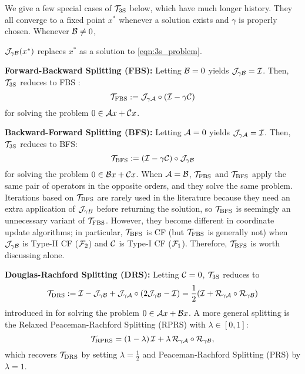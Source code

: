 We give a few special cases of ${{\mathcal{T}}_{\mathrm{3S}}}$ below, which have much longer history. They all converge to a fixed point $x^*$ whenever a solution exists and $\gamma$ is properly chosen. Whenever ${\mathcal{B}}\neq 0$, {${\mathcal{J}}_{\gamma {\mathcal{B}}}(x^*)$ replaces $x^*$  as a solution to \eqref{eqn:3s_problem}.

 \textbf{Forward-Backward Splitting (FBS):} Letting ${\mathcal{B}}=0$ yields ${\mathcal{J}}_{\gamma{\mathcal{B}}}={\mathcal{I}}$. Then, ${{\mathcal{T}}_{\mathrm{3S}}}$ reduces to FBS \cite{passty1979FBS}:
 \begin{equation}\label{eq:FBS}
 \TFBS:=\cJ_{\gamma \cA}\circ(\cI-\gamma \cC)
 \end{equation}
 for solving the problem $0\in{\mathcal{A}} x+{\mathcal{C}} x$.

\textbf{Backward-Forward Splitting (BFS):} Letting ${\mathcal{A}}=0$ yields ${\mathcal{J}}_{\gamma{\mathcal{A}}}={\mathcal{I}}$. Then, ${{\mathcal{T}}_{\mathrm{3S}}}$ reduces to BFS:
  \begin{equation}\label{eq:BFS}\TBFS:=(\cI-\gamma \cC)\circ \cJ_{\gamma \cB}
  \end{equation}
for solving the problem $0\in{\mathcal{B}} x+{\mathcal{C}} x$. When ${\mathcal{A}}={\mathcal{B}}$, ${{\mathcal{T}}_{\mathrm{FBS}}}$ and ${{\mathcal{T}}_{\mathrm{BFS}}}$ apply the same pair of operators in the opposite orders, and they solve the same problem. Iterations based on ${{\mathcal{T}}_{\mathrm{BFS}}}$ are rarely used in the literature because they  need an extra application of ${\mathcal{J}}_{\gamma B}$ before returning the solution, so ${{\mathcal{T}}_{\mathrm{BFS}}}$ is seemingly an unnecessary variant of ${{\mathcal{T}}_{\mathrm{FBS}}}$. However, they become  different in coordinate update algorithms; in particular, ${{\mathcal{T}}_{\mathrm{BFS}}}$ is CF (but ${{\mathcal{T}}_{\mathrm{FBS}}}$ is generally not) when ${\mathcal{J}}_{\gamma {\mathcal{B}}}$ is Type-II CF (${\mathcal{F}}_2$) and ${\mathcal{C}}$ is Type-I CF (${\mathcal{F}}_1$). Therefore, ${{\mathcal{T}}_{\mathrm{BFS}}}$ is worth discussing alone.

\textbf{Douglas-Rachford Splitting (DRS):} Letting ${\mathcal{C}}=0$, ${{\mathcal{T}}_{\mathrm{3S}}}$ reduces to 
  \begin{equation}\label{eq:DRS}\TDRS:=\cI-\cJ_{\gamma \cB}+\cJ_{\gamma\cA}\circ(2\cJ_{\gamma \cB}-\cI)=\frac{1}{2}(\cI+\cR_{\gamma\cA}\circ \cR_{\gamma\cB})
  \end{equation}
introduced in \cite{douglas1956DRS} for solving the problem $0\in{\mathcal{A}} x+{\mathcal{B}} x$. A more general splitting is the  Relaxed Peaceman-Rachford Splitting (RPRS) with $\lambda\in[0,1]$:
 \begin{equation}
\cT_{\text{RPRS}} = (1 - \lambda)\, \cI + \lambda \, \cR_{\gamma \cA} \circ \cR_{\gamma \cB},
\end{equation}
which recovers ${{\mathcal{T}}_{\mathrm{DRS}}}$ by setting $\lambda=\frac{1}{2}$ and Peaceman-Rachford Splitting (PRS) \cite{peaceman1955PRS} by $\lambda=1$.

}
